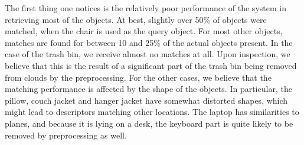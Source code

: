 \documentclass[11pt,a4paper]{kth-mag}
\begin{document}
The first thing one notices is the relatively poor performance of the system in
retrieving most of the objects. At best, slightly over 50\% of objects were
matched, when the chair is used as the query object. For most other objects,
matches are found for between 10 and 25\% of the actual objects present. In the
case of the trash bin, we receive almost no matches at all. Upon inspection, we
believe that this is the result of a significant part of the trash bin being
removed from clouds by the preprocessing. For the other cases, we believe that
the matching performance is affected by the shape of the objects. In particular,
the pillow, couch jacket and hanger jacket have somewhat distorted shapes, which
might lead to descriptors matching other locations. The laptop has similarities
to planes, and because it is lying on a desk, the keyboard part is quite likely
to be removed by preprocessing as well.
\end{document}

